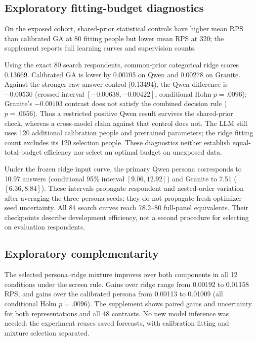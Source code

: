 \documentclass[10pt,twocolumn]{article}
\begin{document}
\subsection{Exploratory fitting-budget diagnostics}
On the exposed cohort, shared-prior statistical controls have higher mean RPS
than calibrated GA at 80 fitting people but lower mean RPS at 320; the
supplement reports full learning curves and supervision counts.

Using the exact 80 search respondents, common-prior categorical ridge scores
0.13669. Calibrated GA is lower by 0.00705 on Qwen and 0.00278 on Granite.
Against the stronger raw-answer control (0.13494), the Qwen difference is
$-0.00530$ (crossed interval $[-0.00638,-0.00422]$, conditional Holm
$p=.0096$); Granite's $-0.00103$ contrast does not satisfy the combined
decision rule ($p=.0656$). Thus a restricted positive Qwen result survives
the shared-prior check, whereas a cross-model claim against that control
does not. The LLM still uses 120 additional calibration people and pretrained
parameters; the ridge fitting count excludes its 120 selection people.
These diagnostics neither establish equal-total-budget efficiency nor select
an optimal budget on unexposed data.



Under the frozen ridge input curve, the primary Qwen persona corresponds
to 10.97 answers (conditional 95\% interval $[9.06,12.92]$) and Granite to
7.51 ($[6.36,8.84]$). These intervals propagate respondent and nested-order
variation after averaging the three persona seeds; they do not propagate
fresh optimizer-seed uncertainty. All 84 search curves reach 78.2--80
full-panel equivalents. Their checkpoints describe development efficiency,
not a second procedure for selecting on evaluation respondents.

\subsection{Exploratory complementarity}
The selected persona--ridge mixture improves over both components in all
12 conditions under the screen rule. Gains over ridge range from 0.00192 to
0.01158 RPS, and gains over the calibrated persona from 0.00113 to 0.01009
(all conditional Holm $p=.0096$). The supplement shows paired gains and uncertainty for both representations
and all 48 contrasts.
No new model inference was needed: the experiment reuses saved forecasts,
with calibration fitting and mixture selection separated.
\end{document}

